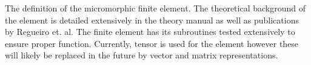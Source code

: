 The definition of the micromorphic finite element. The theoretical background of the element is detailed extensively in the theory manual as well as publications by Regueiro et. al. The finite element has its subroutines tested extensively to ensure proper function. Currently, tensor is used for the element however these will likely be replaced in the future by vector and matrix representations.

